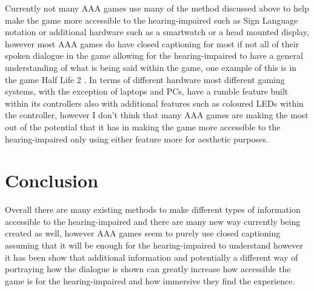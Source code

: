 \documentclass{scrartcl}
\begin{document}
Currently not many AAA games use many of the method discussed above to help make the game more accessible to the hearing-impaired such as Sign Language notation or additional hardware such as a smartwatch or a head mounted display, however most AAA games do have closed captioning for most if not all of their spoken dialogue in the game allowing for the hearing-impaired to have a general understanding of what is being said within the game, one example of this is in the game Half Life 2 \cite{Coutinho}. In terms of different hardware most different gaming systems, with the exception of laptops and PCs, have a rumble feature built within its controllers also with additional features such as coloured LEDs within the controller, however I don’t think that many AAA games are making the most out of the potential that it has in making the game more accessible to the hearing-impaired only using either feature more for aesthetic purposes.

\section{Conclusion}

Overall there are many existing methods to make different types of information accessible to the hearing-impaired and there are many new way currently being created as well, however AAA games seem to purely use closed captioning assuming that it will be enough for the hearing-impaired to understand however it has been show that additional information and potentially a different way of portraying how the dialogue is shown can greatly increase how accessible the game is for the hearing-impaired and how immersive they find the experience.



\end{document}
